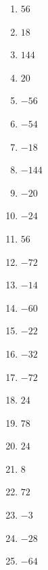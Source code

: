 %
%
    \begin{enumerate}[cols=4]
        \item \(56\)
        \item \(18\)
        \item \(144\)
        \item \(20\)
        \item \(-56\)
        \item \(-54\)
        \item \(-18\)
        \item \(-144\)
        \item \(-20\)
        \item \(-24\)
        \item \(56\)
        \item \(-72\)
        \item \(-14\)
        \item \(-60\)
        \item \(-22\)
        \item \(-32\)
        \item \(-72\)
        \item \(24\)
        \item \(78\)
        \item \(24\)
        \item \(8\)
        \item \(72\)
        \item \(-3\)
        \item \(-28\)
        \item \(-64\)
    \end{enumerate}
